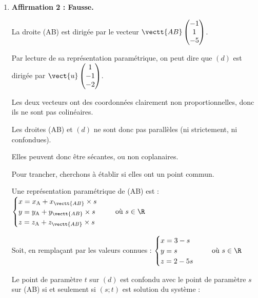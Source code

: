 \begin{enumerate}
\begin{enumerate}
			I est donc un point du plan $(\mathcal{P})$.

			Le plan $(\mathcal{P})$ est bien orthogonal à la droite (AB), et passe par le milieu du segment [AB]

			(autrement dit, c'est le plan médiateur du segment [AB]).

			\item \textbf{Affirmation 2 : Fausse.}

			La droite (AB) est dirigée par le vecteur $\vectt{AB} \begin{pmatrix} -1\\1\\-5 \end{pmatrix} $.

			Par lecture de sa représentation paramétrique, on peut dire que $(d)$ est dirigée par $\vect{u}\begin{pmatrix} 1\\-1\\-2 \end{pmatrix}$.

			Les deux vecteurs ont des coordonnées clairement non proportionnelles, donc ils ne sont pas colinéaires.

			Les droites (AB) et $(d)$ ne sont donc pas parallèles (ni strictement, ni confondues).

			Elles peuvent donc être sécantes, ou non coplanaires.

			Pour trancher, cherchons à établir si elles ont un point commun.

			Une représentation paramétrique de (AB) est :\quad $\begin{cases}
				x = x_{\mathrm{A}} + x_{\vectt{AB}}\times s\\
				y = y_{\mathrm{A}} + y_{\vectt{AB}}\times s\\
				z = z_{\mathrm{A}} + z_{\vectt{AB}}\times s\\
			\end{cases}\quad \text{ où } s \in \R$

			Soit, en remplaçant par les valeurs connues : \quad $\begin{cases}
				x = 3 - s\\ y = s \\ z = 2 - 5s
			\end{cases}\quad \text{ où } s \in \R$

			Le point de paramètre $t$ sur $(d)$ est confondu avec le point de paramètre $s$ sur (AB) si et seulement si $(s ; t)$ est solution du système :


\end{enumerate}
\end{enumerate}
